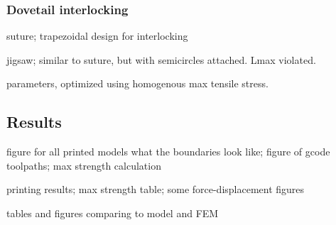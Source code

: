 \subsubsection{Dovetail interlocking}
suture; trapezoidal design for interlocking

jigsaw; similar to suture, but with semicircles attached. Lmax violated.

parameters, optimized using homogenous max tensile stress.


\subsection{Results}
figure for all printed models what the boundaries look like;
figure of gcode toolpaths;
max strength calculation

printing results; max strength table; some force-displacement figures

tables and figures comparing to model and FEM